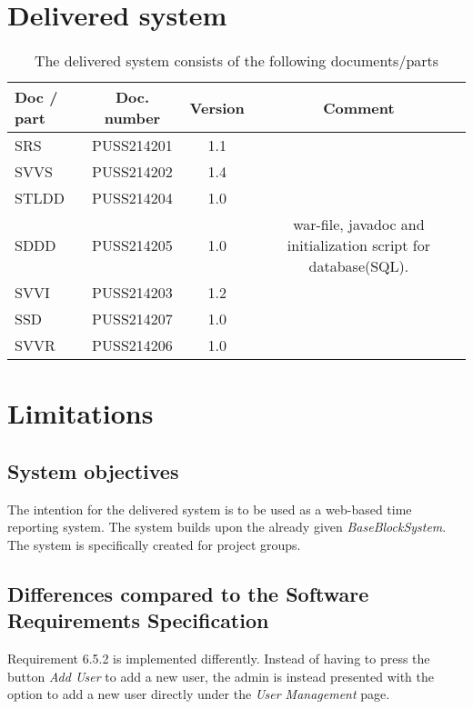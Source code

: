 \documentclass{article}
\begin{document}
\section{Delivered system}
 \begin{table}[h]
            \centering
            
             \caption{The delivered system consists of the following documents/parts}
            \begin{tabular}{|l|c|c|c|}
                \hline
                    \textbf{Doc / part} & \textbf{Doc.  number} & \textbf{Version} & \textbf{Comment} \\
                \hline
                    SRS & PUSS214201 & 1.1 &   \\
                 \hline
                    SVVS & PUSS214202 & 1.4 &  \\
                 \hline
                    STLDD & PUSS214204 & 1.0 &  \\
                 \hline
                    SDDD & PUSS214205  & 1.0 & war-file, javadoc and initialization script for database(SQL).   \\
                 \hline
                    SVVI & PUSS214203 & 1.2 &  \\
                 \hline
                    SSD & PUSS214207 & 1.0 &  \\
                 \hline
                    SVVR & PUSS214206 & 1.0 &  \\
                 \hline
                 
            \end{tabular}
           
            \label{activitytable}
        \end{table}

\section{Limitations}


\subsection{System objectives}
The intention for the delivered system is to be used as a web-based time reporting system. The system builds upon the already given \textit{BaseBlockSystem}. The system is specifically created for project groups.

\subsection{Differences compared to the Software Requirements Specification}
Requirement 6.5.2 is implemented differently. Instead of having to press  the button \textit{Add User} to add a new user, the admin is instead presented with the option to add a new user directly under the \textit{User Management} page.
\end{document}
